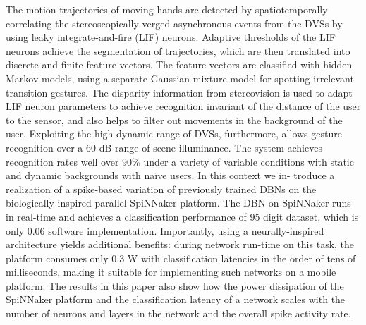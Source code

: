 The motion trajectories of moving hands are detected by spatiotemporally correlating the stereoscopically verged asynchronous events from the DVSs by using leaky integrate-and-fire (LIF) neurons. Adaptive thresholds of the LIF neurons achieve the segmentation of trajectories, which are then translated into discrete and finite feature vectors. The feature vectors are classified with hidden Markov models, using a separate Gaussian mixture model for spotting irrelevant transition gestures. The disparity information from stereovision is used to adapt LIF neuron parameters to achieve recognition invariant of the distance of the user to the sensor, and also helps to filter out movements in the background of the user. Exploiting the high dynamic range of DVSs, furthermore, allows gesture recognition over a 60-dB range of scene illuminance. The system achieves recognition rates well over 90\% under a variety of variable conditions with static and dynamic backgrounds with naïve users.
In  this  context  we  in-
troduce  a  realization  of  a  spike-based  variation  of  previously
trained  DBNs  on  the  biologically-inspired  parallel  SpiNNaker
platform. The DBN on SpiNNaker runs in real-time and achieves
a classification performance of 95%
digit  dataset,  which  is  only  0.06%
software implementation. Importantly, using a neurally-inspired
architecture yields additional benefits: during network run-time
on this task, the platform consumes only 0.3 W with classification
latencies in the order of tens of milliseconds, making it suitable
for  implementing  such  networks  on  a  mobile  platform.  The
results in this paper also show how the power dissipation of the
SpiNNaker platform and the classification latency of a network
scales with the number of neurons and layers in the network and
the overall spike activity rate.


